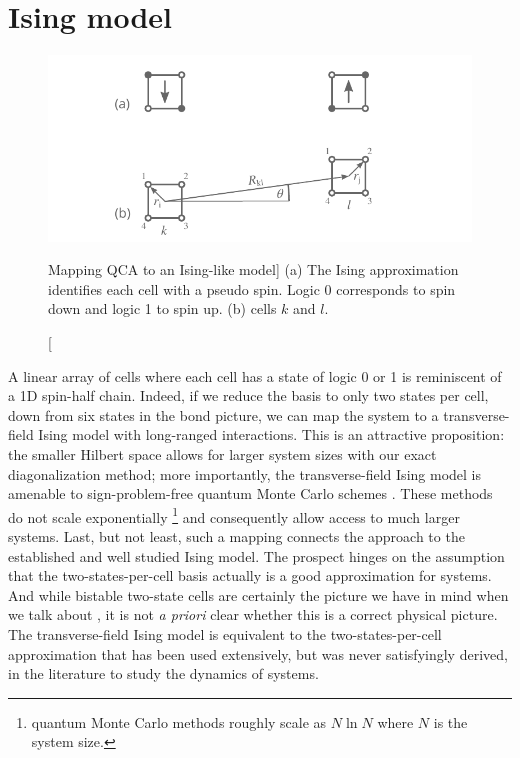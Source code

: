 \section{Ising model}


%
\begin{figure}
  \center
  \includegraphics{ising}
  \caption
  [Mapping QCA to an Ising-like model]
  {
  \label{fig:ising}
  (a) The Ising approximation identifies each cell with a pseudo spin. Logic 0
  corresponds to spin down and logic 1 to spin up. (b)  cells $k$ and
  $l$. 
  }
\end{figure}
%
A linear array of  cells where each cell has a state of logic 0 or 1
is reminiscent of a 1D spin-half chain. Indeed, if we reduce the basis to only
two states per cell, down from six states in the bond picture, we can map the
 system to a transverse-field Ising model with long-ranged
interactions. This is an attractive proposition: the smaller Hilbert space
allows for larger system sizes with our exact diagonalization method; more
importantly, the transverse-field Ising model is amenable to sign-problem-free
 quantum Monte Carlo schemes \cite{Sandvik2003}. These methods do not
scale exponentially%
%
\footnote{
 quantum Monte Carlo methods roughly scale as $N \ln N$ where $N$ is
the system size.
}
%
and consequently allow access to much larger systems. Last, but not least, such
a mapping connects the  approach to the established and well studied
Ising model. The prospect hinges on the assumption that the two-states-per-cell
basis actually is a good approximation for  systems. And while
bistable two-state cells are certainly the picture we have in mind when we talk
about , it is not \emph{a priori} clear whether this is a correct
physical picture. The transverse-field Ising model is equivalent to the
two-states-per-cell approximation that has been used extensively, but was never
satisfyingly derived, in the literature to study the dynamics of 
systems.

